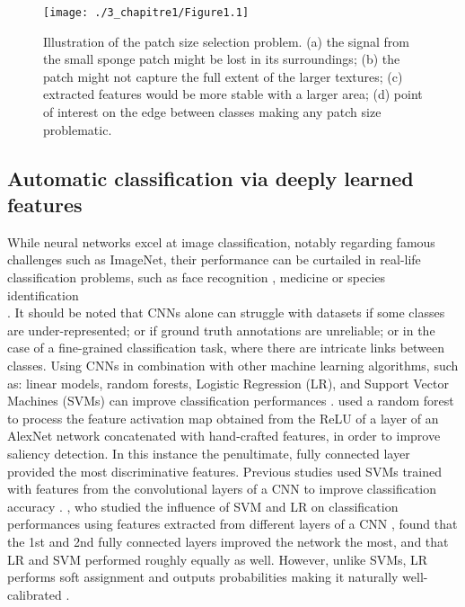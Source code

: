 \begin{figure}[H]
	\begin{center}
	\texttt{[image: ./3\_chapitre1/Figure1.1]}
		\caption[Illustration of the patch size selection problem]{Illustration of the patch size selection problem. (a) the signal from the small sponge patch might be lost in its surroundings; (b) the patch might not capture the full extent of the larger textures; (c) extracted features would be more stable with a larger area; (d) point of interest on the edge between classes making any patch size problematic.}
	\label{figure1.1}
\end{center}
\end{figure}

\subsection{Automatic classification via deeply learned features}\label{chapitre1_2.3}
While neural networks excel at image classification, notably regarding famous challenges such as ImageNet, their performance can be curtailed in real-life classification problems, such as face recognition \citep{zhou_naive-deep_2015}, medicine \citep{de_fauw_clinically_2018} or species identification \\
\citep{mehdipour_ghazi_open-set_2016}. It should be noted that CNNs alone can struggle with datasets if some classes are under-represented; or if ground truth annotations are unreliable; or in the case of a fine-grained classification task, where there are intricate links between classes. Using CNNs in combination with other machine learning algorithms, such as: linear models, random forests, Logistic Regression (LR), and Support Vector Machines (SVMs) can improve classification performances \citep{gao_combining_2017, li_visual_2016}. \citet{li_visual_2016} used a random forest to process the feature activation map obtained from the ReLU of a layer of an AlexNet network concatenated with hand-crafted features, in order to improve saliency detection. In this instance the penultimate, fully connected layer provided the most discriminative features. Previous studies used SVMs trained with features from the convolutional layers of a CNN to improve classification accuracy \citep{gao_combining_2017, huang_large-scale_2006}. \citet{donahue_decaf:_2014}, who studied the influence of SVM and LR on classification performances using features extracted from different layers of a CNN \citep{donahue_decaf:_2014}, found that the 1st and 2nd fully connected layers improved the network the most, and that LR and SVM performed roughly equally as well. However, unlike SVMs, LR performs soft assignment and outputs probabilities making it naturally well-calibrated \citep{niculescu-mizil_predicting_2005}.

